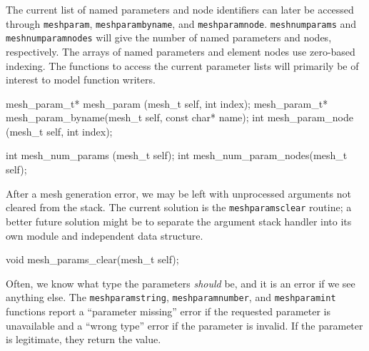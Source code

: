 \nwendcode{}\nwdocspar

The current list of named parameters and node identifiers can
later be accessed through {\tt{}mesh{}param}, {\tt{}mesh{}param{}byname},
and {\tt{}mesh{}param{}node}.  {\tt{}mesh{}num{}params} and {\tt{}mesh{}num{}param{}nodes}
will give the number of named parameters and nodes, respectively.
The arrays of named parameters and element nodes use zero-based
indexing.  The functions to access the current parameter lists will
primarily be of interest to model function writers.

\nwenddocs{}\plusendmoddef
mesh_param_t* mesh_param       (mesh_t self, int index);
mesh_param_t* mesh_param_byname(mesh_t self, const char* name);
int           mesh_param_node  (mesh_t self, int index);

\nwendcode{}\nwdocspar

\nwenddocs{}\plusendmoddef
int mesh_num_params     (mesh_t self);
int mesh_num_param_nodes(mesh_t self);

\nwendcode{}\nwdocspar

After a mesh generation error, we may be left with unprocessed
arguments not cleared from the stack.  The current solution is
the {\tt{}mesh{}params{}clear} routine; a better future solution might
be to separate the argument stack handler into its own module
and independent data structure.

\nwenddocs{}\plusendmoddef
void mesh_params_clear(mesh_t self);

\nwendcode{}\nwdocspar

Often, we know what type the parameters \emph{should} be,
and it is an error if we see anything else.  The
{\tt{}mesh{}param{}string}, {\tt{}mesh{}param{}number}, and
{\tt{}mesh{}param{}int} functions report a ``parameter missing''
error if the requested parameter is unavailable and a
``wrong type'' error if the parameter is invalid.  If
the parameter is legitimate, they return the value.

